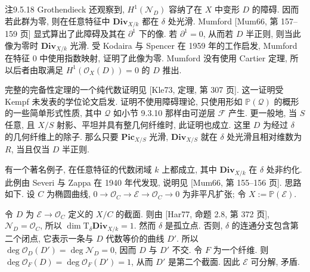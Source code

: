\begin{origstatement}{注}{9.5.18}
Grothendieck 还观察到, $H^1(\mathcal N_D)$ 容纳了在 $X$ 中变形 $D$ 的障碍. 因而若此群为零, 则在任意特征中 $\mathbf{Div}_{X/k}$ 都在 $\delta$ 处光滑. Mumford [Mum66, 第 157--159 页] 显式算出了此障碍及其在 $\partial^1$ 下的像. 若 $\partial^1=0$, 从而若 $D$ 半正则,
 则当此像为零时 $\mathbf{Div}_{X/k}$ 光滑. 受 Kodaira 与 Spencer 在 1959 年的工作启发, Mumford 在特征 $0$ 中使用指数映射, 证明了此像为零. Mumford 没有使用 Cartier 定理, 所以后者由取满足 $H^1(\mathcal O_X(D))=0$ 的 $D$ 推出.

完整的完备性定理的一个纯代数证明见 [Kle73, 定理, 第 307 页]. 这一证明受 Kempf 未发表的学位论文启发. 证明不使用障碍理论, 只使用形如 $\mathbb P(\mathcal Q)$ 的概形的一些简单形式性质, 其中 $\mathcal Q$ 如小节 9.3.10 那样由可逆层 $\mathcal F$ 产生. 更一般地, 当 $S$ 任意, 且 $X/S$ 射影、平坦并具有整几何纤维时, 此证明也成立. 这里 $D$ 为经过 $\delta$ 的几何纤维上的除子. 那么只要 $\mathbf{Pic}_{X/S}$ 光滑, $\mathbf{Div}_{X/S}$ 就在 $\delta$ 处光滑且相对维数为 $R$, 当且仅当 $D$ 半正则.

有一个著名例子, 在任意特征的代数闭域 $k$ 上都成立, 其中 $\mathbf{Div}_{X/k}$ 在 $\delta$ 处非约化. 此例由 Severi 与 Zappa 在 1940 年代发现, 说明见 [Mum66, 第 155--156 页]. 思路如下. 设 $C$ 为椭圆曲线, $0\to\mathcal O_C\to\mathcal E\to\mathcal O_C\to0$ 为非平凡扩张; 令 $X:=\mathbb P(\mathcal E)$.

令 $D$ 为 $\mathcal E\to\mathcal O_C$ 定义的 $X/C$ 的截面. 则由 [Har77, 命题 2.8, 第 372 页], $\mathcal N_D=\mathcal O_C$, 所以 $\dim\mathrm T_\delta\mathbf{Div}_{X/k}=1$. 然而 $\delta$ 是孤立点. 否则, $\delta$ 的连通分支包含第二个闭点, 它表示一条与 $D$ 代数等价的曲线 $D'$. 所以 $\deg\mathcal O_D(D')=\deg\mathcal N_D=0$, 因而 $D$ 与 $D'$ 不交. 令 $F$ 为一个纤维. 则 $\deg\mathcal O_F(D)=\deg\mathcal O_F(D')=1$, 从而 $D'$ 是第二个截面. 因此 $\mathcal E$ 可分解, 矛盾.
\end{origstatement}

